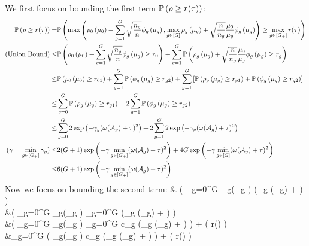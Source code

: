 	We first focus on bounding the first term $\mathbb{P} \left( \rho \geq r(\tau) \right)$:
	{\small \begin{align}	
	\nr 	
	\pr \left( \rho \geq r(\tau) \right)	
	=& \pr \left( \max\left(\rho_0\left(\mu_0\right) + \sum_{g=1}^{G} \sqrt{\frac{n_g}{n}} \phi_g\left(\mu_g\right), \max_{g \in [G]} \rho_g\left(\mu_g\right) + \sqrt{\frac{n}{n_g}} \frac{\mu_0}{\mu_g}\phi_g\left(\mu_g\right)\right) \geq \max_{g \in [G_+] } r(\tau)  \right) 
	\\ \nr 
	(\text{Union Bound}) \leq& \pr \left(\rho_0\left(\mu_0 \right) + \sum_{g=1}^{G} \sqrt{\frac{n_g}{n}} \phi_g\left(\mu_g\right) \geq r_0  \right)   + \sum_{g=1}^{G} \pr \left( \rho_g\left(\mu_g\right) + \sqrt{\frac{n}{n_g}} \frac{\mu_0}{\mu_g}\phi_g\left(\mu_g\right) \geq r_g  \right)
	\\ \nr 
	\leq& \pr \left(\rho_0\left(\mu_0 \right) \geq r_{01} \right) + \sum_{g=1}^{G} \pr\left( \phi_g\left(\mu_g\right) \geq r_{g2}  \right)   + \sum_{g=1}^{G} \left[\pr \left( \rho_g\left(\mu_g\right) \geq r_{g1} \right) + \pr \left(\phi_g\left(\mu_g\right) \geq r_{g2}  \right)\right]
	\\ \nr 
	\leq& \sum_{g=0}^{G} \pr \left( \rho_g\left(\mu_g\right) \geq r_{g1} \right)  + 2\sum_{g=1}^{G} \pr\left( \phi_g\left(\mu_g\right) \geq r_{g2}  \right)   
	\\ \nr 	
	\leq& \sum_{g=0}^{G} 2 \exp\left( -\gamma_g (\omega(\cA_g) + \tau)^2  \right)  + 2\sum_{g=1}^{G} 2\exp\left( -\gamma_g (\omega(\cA_g) + \tau)^2  \right)      
	\\ \nr 	
	(\gamma = \min_{g \in [G_+]} \gamma_g) \leq& 2(G+1)\exp\left( -\gamma \min_{g \in [G_+]} (\omega(\cA_g) + \tau)^2  \right)  + 4 G \exp\left( -\gamma \min_{g \in [G]} (\omega(\cA_g) + \tau)^2  \right)      
	\\  \label{eq:part1} 
	\leq& 6 (G+1)\exp\left( -\gamma \min_{g \in [G_+]} (\omega(\cA_g) + \tau)^2  \right)  
	\end{align}	}
	Now we focus on bounding the second term:
	{\small\bea
	\nr 	
	& \pr \left(   \sum_{g=0}^{G}  \eta_g\left(\mu_g \right)  
	\geq {} (\max_{g \in [G_+]} \omega(\cA_g) + \tau) \right)
	\\ \nr 
	&\hspace*{5.5cm}\leq \pr \left(   \sum_{g=0}^{G}  \eta_g\left(\mu_g \right)  
	\geq {} \sum_{g=0}^{G}  (\max_{g \in [G_+]} \omega(\cA_g) + \tau) \right) 
	\\ \nr 
	&\hspace*{5.5cm}\leq \pr \left( \sum_{g=0}^{G}  \eta_g\left(\mu_g \right)  \geq \sum_{g=0}^{G} c_g  (\max_{g \in [G_+]} \omega(\cA_g) + \tau) \right) 
	+ \pr \left( \rho \geq r(\tau) \right)	
	\\ \label{eq:part2}
	&\hspace*{5.5cm}\leq \sum_{g=0}^{G} \pr \left(    \eta_g\left(\mu_g \right)  \geq c_g  (\max_{g \in [G_+]} \omega(\cA_g) + \tau) \right) 
	+ \pr \left( \rho \geq r(\tau) \right)		
	\eea}
